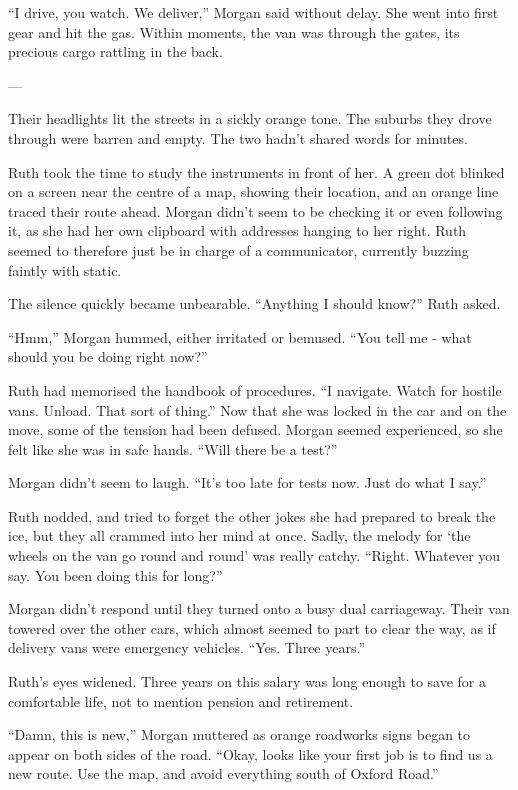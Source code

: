 “I drive, you watch. We deliver,” Morgan said without delay. She went into first gear and hit the gas. Within moments, the van was through the gates, its precious cargo rattling in the back. 

---

Their headlights lit the streets in a sickly orange tone. The suburbs they drove through were barren and empty. The two hadn’t shared words for minutes. 

Ruth took the time to study the instruments in front of her. A green dot blinked on a screen near the centre of a map, showing their location, and an orange line traced their route ahead. Morgan didn’t seem to be checking it or even following it, as she had her own clipboard with addresses hanging to her right. Ruth seemed to therefore just be in charge of a communicator, currently buzzing faintly with static. 

The silence quickly became unbearable. “Anything I should know?” Ruth asked.

“Hmm,” Morgan hummed, either irritated or bemused. “You tell me - what should you be doing right now?”

Ruth had memorised the handbook of procedures. “I navigate. Watch for hostile vans. Unload. That sort of thing.” Now that she was locked in the car and on the move, some of the tension had been defused. Morgan seemed experienced, so she felt like she was in safe hands. “Will there be a test?”

Morgan didn’t seem to laugh. “It’s too late for tests now. Just do what I say.”

Ruth nodded, and tried to forget the other jokes she had prepared to break the ice, but they all crammed into her mind at once. Sadly, the melody for ‘the wheels on the van go round and round’ was really catchy. “Right. Whatever you say. You been doing this for long?”

Morgan didn’t respond until they turned onto a busy dual carriageway. Their van towered over the other cars, which almost seemed to part to clear the way, as if delivery vans were emergency vehicles. “Yes. Three years.”

Ruth’s eyes widened. Three years on this salary was long enough to save for a comfortable life, not to mention pension and retirement. 

“Damn, this is new,” Morgan muttered as orange roadworks signs began to appear on both sides of the road. “Okay, looks like your first job is to find us a new route. Use the map, and avoid everything south of Oxford Road.”

